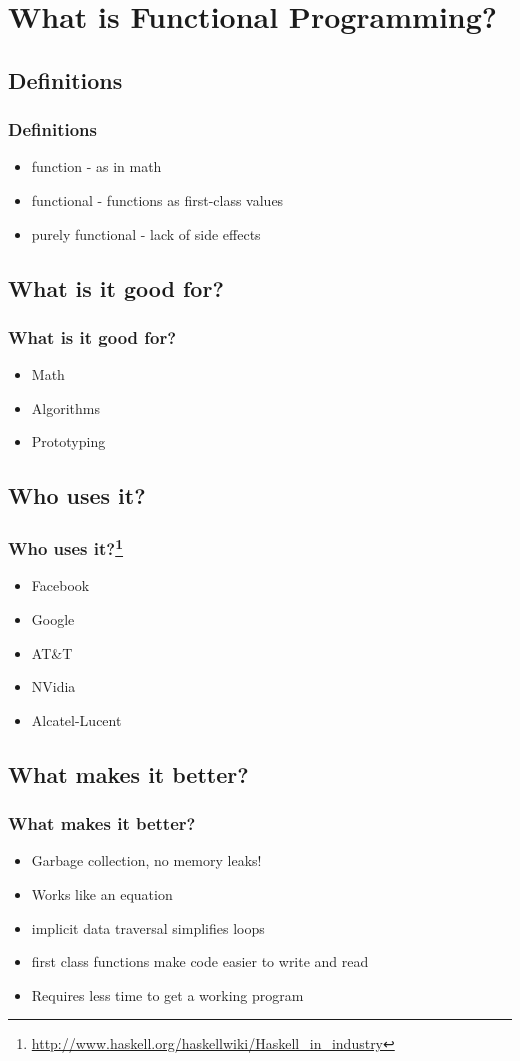 \documentclass[xcolor=pdftex,dvipsnames,table]{beamer}
\begin{document}
\section{What is Functional Programming?}
\subsection{Definitions}
\begin{frame}
  \frametitle{Definitions}
  \begin{itemize}
  \item function - as in math
  \item functional - functions as first-class values
  \item purely functional - lack of side effects
  \end{itemize}
\end{frame}

\subsection{What is it good for?}
\begin{frame}
  \frametitle{What is it good for?}
  \begin{itemize}
  \item Math
  \item Algorithms
  \item Prototyping
  \end{itemize}
\end{frame}

\subsection{Who uses it?}
\begin{frame}
  \frametitle{Who uses it?\footnote{\url{http://www.haskell.org/haskellwiki/Haskell_in_industry}}}
  \begin{itemize}
  \item Facebook
  \item Google
  \item AT\&T
  \item NVidia
  \item Alcatel-Lucent
  \end{itemize}
\end{frame}

\subsection{What makes it better?}
\begin{frame}
  \frametitle{What makes it better?}
  \begin{itemize}
  \item Garbage collection, no memory leaks!
  \item Works like an equation
  \item implicit data traversal simplifies loops
  \item first class functions make code easier to write and read
  \item Requires less time to get a working program
  \end{itemize}
\end{frame}
\end{document}
